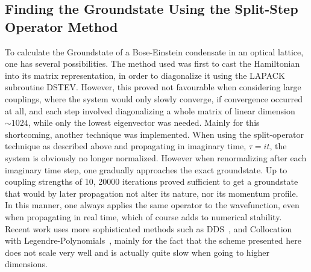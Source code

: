 \subsection{Finding the Groundstate Using the Split-Step Operator Method}
To calculate the Groundstate of a Bose-Einstein condensate in an optical lattice, one has several possibilities. The method used was
first to cast the Hamiltonian into its matrix representation, in order to diagonalize it using the LAPACK subroutine DSTEV. However,
this proved not favourable when considering large couplings, where the system would only slowly converge, if convergence occurred at all,
and each step involved diagonalizing a whole matrix of linear dimension $\sim 1024$, while only the lowest eigenvector was needed.
Mainly for this shortcoming, another technique was implemented. When using the split-operator technique as described above and propagating
in imaginary time, $\tau=it$, the system is obviously no longer normalized. However when renormalizing after each imaginary time step,
one gradually approaches the exact groundstate. Up to coupling strengths of 10, 20000 iterations proved sufficient to get a
groundstate that would by later propagation not alter its nature, nor its momentum profile. In this manner, one always applies
the same operator to the wavefunction, even when
propagating in real time, which of course adds to numerical stability.
 Recent work uses more sophisticated methods such as DDS~\cite{kostrun},
and Collocation with Legendre-Polynomials~\cite{choi}, mainly for the fact that the scheme presented here does not scale very well and is actually quite slow when going to higher
dimensions. 

